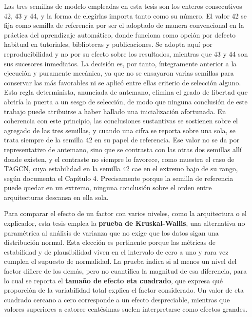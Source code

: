 Las tres semillas de modelo empleadas en esta tesis son los enteros consecutivos 42, 43 y 44, y la forma de elegirlas importa tanto como su número. El valor 42 se fija como semilla de referencia por ser el adoptado de manera convencional en la práctica del aprendizaje automático, donde funciona como opción por defecto habitual en tutoriales, bibliotecas y publicaciones. Se adopta aquí por reproducibilidad y no por su efecto sobre los resultados, mientras que 43 y 44 son sus sucesores inmediatos. La decisión es, por tanto, íntegramente anterior a la ejecución y puramente mecánica, ya que no se ensayaron varias semillas para conservar las más favorables ni se aplicó entre ellas criterio de selección alguno. Esta regla determinista, anunciada de antemano, elimina el grado de libertad que abriría la puerta a un sesgo de selección, de modo que ninguna conclusión de este trabajo puede atribuirse a haber hallado una inicialización afortunada. En coherencia con este principio, las conclusiones sustantivas se sostienen sobre el agregado de las tres semillas, y cuando una cifra se reporta sobre una sola, se trata siempre de la semilla 42 en su papel de referencia. Ese valor no se da por representativo de antemano, sino que se contrasta con las otras dos semillas allí donde existen, y el contraste no siempre lo favorece, como muestra el caso de TAGCN, cuya estabilidad en la semilla 42 cae en el extremo bajo de su rango, según documenta el Capítulo 4. Precisamente porque la semilla de referencia puede quedar en un extremo, ninguna conclusión sobre el orden entre arquitecturas descansa en ella sola.

Para comparar el efecto de un factor con varios niveles, como la arquitectura o el explicador, esta tesis emplea la \textbf{prueba de Kruskal-Wallis}, una alternativa no paramétrica al análisis de varianza que no exige que los datos sigan una distribución normal. Esta elección es pertinente porque las métricas de estabilidad y de plausibilidad viven en el intervalo de cero a uno y rara vez cumplen el supuesto de normalidad. La prueba indica si al menos un nivel del factor difiere de los demás, pero no cuantifica la magnitud de esa diferencia, para lo cual se reporta el \textbf{tamaño de efecto eta cuadrado}, que expresa qué proporción de la variabilidad total explica el factor considerado. Un valor de eta cuadrado cercano a cero corresponde a un efecto despreciable, mientras que valores superiores a catorce centésimas suelen interpretarse como efectos grandes.

